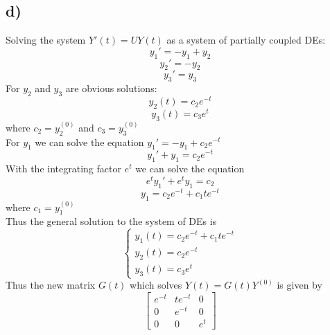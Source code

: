 \documentclass{article}
\begin{document}
\subsection*{d)}
Solving the system $Y'(t) = UY(t)$ as a system of partially coupled DEs: 
$$y_1' = -y_1 + y_2$$
$$y_2' = -y_2$$
$$y_3' = y_3$$
For $y_2$ and $y_3$ are obvious solutions:
$$y_2(t) = c_2e^{-t}$$
$$y_3(t) = c_3e^t$$
where $c_2 = y_2^{(0)}$ and $c_3 = y_3^{(0)}$ \\
For $y_1$ we can solve the equation $y_1' = -y_1 + c_2e^{-t} $
$$y_1' + y_1 = c_2e^{-t}$$
With the integrating factor $e^t$ we can solve the equation
$$e^ty_1' + e^ty_1 = c_2$$
$$y_1 = c_2e^{-t} + c_1te^{-t}$$
where $c_1 = y_1^{(0)}$\\
Thus the general solution to the system of DEs is
$$\begin{cases}
    y_1(t) = c_2e^{-t} + c_1te^{-t}\\
    y_2(t) = c_2e^{-t}\\
    y_3(t) = c_3e^t
\end{cases}$$
Thus the new matrix $G(t)$ which solves $Y(t) = G(t)Y^{(0)}$ is given by
$$\begin{bmatrix}
    e^{-t} & te^{-t} & 0\\
    0 & e^{-t} & 0\\
    0 & 0 & e^t
\end{bmatrix} $$
\end{document}
